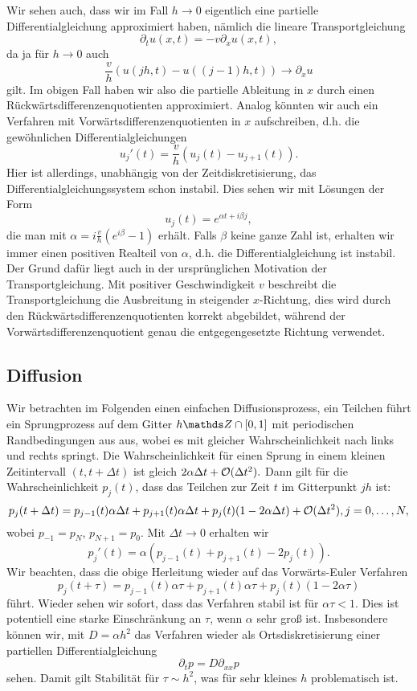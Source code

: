 Wir sehen auch, dass wir im Fall $h \rightarrow 0$ eigentlich eine partielle Differentialgleichung approximiert haben, nämlich die lineare Transportgleichung 
$$ \partial_t u (x,t ) = - v \partial_x u(x,t) , $$
da ja für $h \rightarrow 0$ auch  
$$\frac{v}h (u(jh,t) - u((j-1)h,t)) \rightarrow \partial_x u $$
gilt. Im obigen Fall haben wir also die partielle Ableitung in $x$ durch einen Rückwärtsdifferenzenquotienten approximiert. Analog könnten wir auch ein Verfahren mit Vorwärtsdifferenzenquotienten in $x$ aufschreiben, d.h. die gewöhnlichen Differentialgleichungen 
$$ u_j'(t) =   \frac{v}h (u_j(t) - u_{j+1}(t)).  $$
Hier ist allerdings, unabhängig von der Zeitdiskretisierung, das Differentialgleichungssystem schon instabil. Dies sehen wir  mit Lösungen der Form 
$$ u_j(t) = e^{\alpha t + i \beta j}, $$
die man mit $\alpha = i \frac{v}h (e^{i\beta} -1)$ erhält. Falls $\beta$ keine ganze Zahl ist, erhalten wir immer einen positiven Realteil von $\alpha$, d.h. die Differentialgleichung ist instabil. Der Grund dafür liegt auch in der ursprünglichen Motivation der Transportgleichung. Mit positiver Geschwindigkeit $v$ beschreibt die Transportgleichung die Ausbreitung in steigender $x$-Richtung, dies wird durch den Rückwärtsdifferenzenquotienten korrekt abgebildet, während der Vorwärtsdifferenzenquotient genau die entgegengesetzte Richtung verwendet.

\subsection{Diffusion}

Wir betrachten im Folgenden einen einfachen Diffusionsprozess, ein Teilchen führt ein Sprungprozess auf dem Gitter $h \Z \cap [0,1]$ mit periodischen Randbedingungen aus aus, wobei es mit gleicher Wahrscheinlichkeit nach links und rechts springt. Die Wahrscheinlichkeit für einen Sprung in einem kleinen Zeitintervall $(t,t+\Delta t)$ ist gleich $2 \alpha \Delta t + {\cal O}(\Delta t^2). $ Dann gilt für die Wahrscheinlichkeit $p_j(t)$, dass das Teilchen zur Zeit $t$ im Gitterpunkt $jh$ ist:
$$ p_j(t+\Delta t ) = p_{j-1}(t) \alpha \Delta t + p_{j+1}(t) \alpha \Delta t + p_j(t) (1- 2 \alpha \Delta t) + {\cal O}(\Delta t^2), j=0,\ldots,N,$$
wobei $p_{-1} = p_N$, $p_{N+1}=p_0$. Mit $\Delta t \rightarrow 0$ erhalten wir 
$$p_j'(t) = \alpha ( p_{j-1}(t)   + p_{j+1}(t)-2  p_j(t)  ). $$
Wir beachten, dass die obige Herleitung wieder auf das Vorwärts-Euler Verfahren 
$$p_j(t+\tau ) = p_{j-1}(t) \alpha \tau + p_{j+1}(t) \alpha \tau + p_j(t) (1- 2 \alpha \tau)   $$
führt. Wieder sehen wir sofort, dass das Verfahren stabil ist für $\alpha \tau < 1$. Dies ist potentiell eine starke Einschränkung an $\tau$, wenn $\alpha$ sehr gro{\ss} ist. Insbesondere können wir, mit $D= \alpha h^2$ das Verfahren wieder als Ortsdiskretisierung einer partiellen Differentialgleichung
$$ \partial_t p = D \partial_{xx} p $$ 
sehen. Damit gilt Stabilität für $\tau \sim h^2$, was für sehr kleines $h$ problematisch ist.

